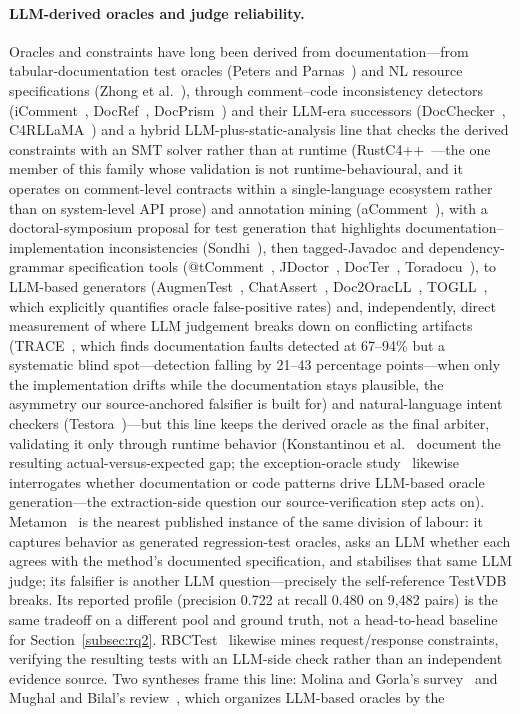 \documentclass[acmsmall,screen,review,anonymous]{acmart}
\newcommand{\system}{TestVDB}
\begin{document}
\paragraph{LLM-derived oracles and judge reliability.}
Oracles and constraints have long been derived from documentation---from tabular-documentation test oracles (Peters and Parnas~\cite{peters98}) and NL resource specifications (Zhong et al.~\cite{zhong09}), through comment--code inconsistency detectors (iComment~\cite{icomment07}, DocRef~\cite{docref13}, DocPrism~\cite{docprism25}) and their LLM-era successors (DocChecker~\cite{docchecker24}, C4RLLaMA~\cite{c4rllama25}) and a hybrid LLM-plus-static-analysis line that checks the derived constraints with an SMT solver rather than at runtime (RustC4++~\cite{rustc4pp26}---the one member of this family whose validation is not runtime-behavioural, and it operates on comment-level contracts within a single-language ecosystem rather than on system-level API prose) and annotation mining (aComment~\cite{acomment11}), with a doctoral-symposium proposal for test generation that highlights documentation--implementation inconsistencies (Sondhi~\cite{sondhi19implicit}), then tagged-Javadoc and dependency-grammar specification tools (@tComment~\cite{tcomment12}, JDoctor~\cite{jdoctor18}, DocTer~\cite{docter22}, Toradocu~\cite{toradocu16}), to LLM-based generators (AugmenTest~\cite{augmentest25}, ChatAssert~\cite{chatassert25}, Doc2OracLL~\cite{doc2oracll25}, TOGLL~\cite{togll25}, which explicitly quantifies oracle false-positive rates) and, independently, direct measurement of where LLM judgement breaks down on conflicting artifacts (TRACE~\cite{trace26}, which finds documentation faults detected at 67--94\% but a systematic blind spot---detection falling by 21--43 percentage points---when only the implementation drifts while the documentation stays plausible, the asymmetry our source-anchored falsifier is built for) and natural-language intent checkers (Testora~\cite{testora26})---but this line keeps the derived oracle as the final arbiter, validating it only through runtime behavior (Konstantinou et al.~\cite{konstantinou24} document the resulting actual-versus-expected gap; the exception-oracle study~\cite{exoracle26} likewise interrogates whether documentation or code patterns drive LLM-based oracle generation---the extraction-side question our source-verification step acts on). Metamon~\cite{metamon25} is the nearest published instance of the same division of labour: it captures behavior as generated regression-test oracles, asks an LLM whether each agrees with the method's documented specification, and stabilises that same LLM judge; its falsifier is another LLM question---precisely the self-reference \system{} breaks. Its reported profile (precision 0.722 at recall 0.480 on 9{,}482 pairs) is the same tradeoff on a different pool and ground truth, not a head-to-head baseline for Section~\ref{subsec:rq2}. RBCTest~\cite{rbctest26} likewise mines request/response constraints, verifying the resulting tests with an LLM-side check rather than an independent evidence source. Two syntheses frame this line: Molina and Gorla's survey~\cite{molina24} and Mughal and Bilal's review~\cite{mughal26}, which organizes LLM-based oracles by the 
\end{document}
